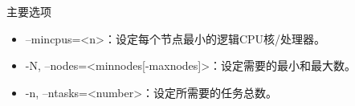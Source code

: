 \begin{frame}{主要选项}
\begin{itemize}
	\item --mincpus=<n>：设定每个节点最小的逻辑CPU核/处理器。
    \item -N, --nodes=<minnodes[-maxnodes]>：设定需要的最小和最大数。
    \item -n, --ntasks=<number>：设定所需要的任务总数。
%
%
%
%
%
%

\end{itemize}
\end{frame}
